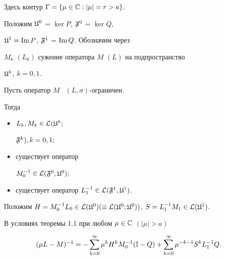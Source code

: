 Здесь контур $\Gamma = \{ \mu \in {\Bbb C}: | \mu | = r > a \}$.





Положим ${\frak U}^0$ = $\ker P$, $ {\frak F}^0$ = $\ker Q$,


${\frak U}^1 = \operatorname{Im} P$, ${\frak F}^1$ = $\operatorname{Im} Q$. Обозначим через


$M_k$ $(L_k)$ сужение оператора $M$ $(L)$ на подпространство


${\frak U}^k$, $k = 0, 1$.





\begin{thms}


Пусть оператор $M$ \ $(L,\sigma)$-ограничен.


Тогда


\begin{itemize}


\item[(i)] $L_{k}, M_k \in {\cal L}({\frak U}^k;$


${\frak F}^k), k = 0,1;$


\item[(ii)] существует оператор


$M_{0}^{-1} \in {\cal L}({\frak F}^{0}, {\frak U}^{0});$


\item[(iii)]


существует оператор $L_{1}^{-1} \in {\cal L}({\frak F}^{1},


{\frak U}^{1})$.


\end{itemize}


\end{thms}





Положим $H = M_{0}^{-1}L_{0} \in {\cal L}({\frak U}^{0})( \equiv


{\cal L}({\frak U}^0; {\frak U}^0))$, $S = L_1^{-1}M_1 \in {\cal


L}({\frak U}^{1})$.





\begin{cornonum}


В условиях теоремы 1.1 при любом $\mu \in {\Bbb C}$ $(| \mu | > a)$


$$


(\mu L-M)^{-1} = - \sum_{k=0}^{\infty} \mu ^k H^kM_0^{-1}({\Bbb I} - Q) +


\sum_{k=0}^{\infty} \mu ^{-k-1} S^kL_1^{-1}Q.


$$


\end{cornonum}





